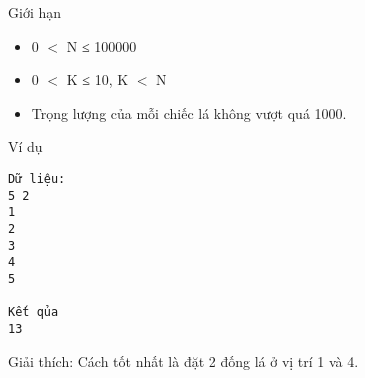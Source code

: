 Giới hạn  
\begin{itemize}
	\item     0 $<$ N ≤ 100000   
	\item     0 $<$ K ≤ 10, K $<$ N   
	\item     Trọng lượng của mỗi chiếc lá không vượt quá 1000.   
\end{itemize}
   Ví dụ  
\begin{verbatim}
Dữ liệu:
5 2
1
2
3
4
5

Kết qủa
13
\end{verbatim}

   Giải thích: Cách tốt nhất là đặt 2 đống lá ở vị trí 1 và 4.
